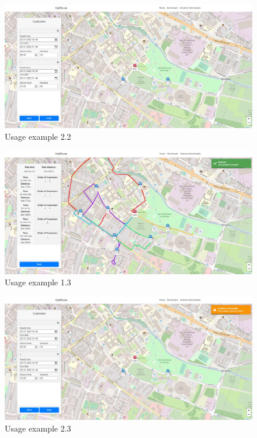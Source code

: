 \documentclass[a4paper,twoside,12pt]{book}
\begin{document}
\begin{figure}[H]
\centering
\includegraphics[scale=0.3]{images/customersScenario2.jpg}
\caption{Usage example 2.2}
\label{fig:customersScenario2}
\end{figure}

\begin{figure}[H]
\centering
\includegraphics[scale=0.3]{images/solutionSuccess.jpg}
\caption{Usage example 1.3}
\label{fig:solutionSuccess}
\end{figure}

\begin{figure}[H]
\centering
\includegraphics[scale=0.3]{images/solutionFailed.jpg}
\caption{Usage example 2.3}
\label{fig:solutionFailed}
\end{figure}
\end{document}
